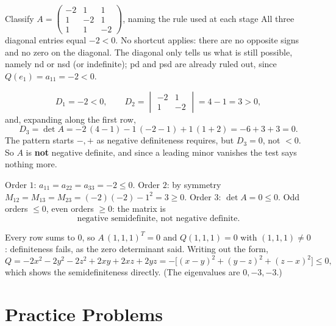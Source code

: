 \begin{worked}{Classify $A=\begin{pmatrix}-2&1&1\\1&-2&1\\1&1&-2\end{pmatrix}$, naming the rule used at each stage}
All three diagonal entries equal $-2<0$. No shortcut applies: there are no
opposite signs and no zero on the diagonal. The diagonal only tells us
what is still possible, namely nd or nsd (or indefinite); pd and psd are
already ruled out, since $Q(e_{1})=a_{11}=-2<0$.

\[
  D_{1}=-2<0,\qquad
  D_{2}=\begin{vmatrix}-2&1\\1&-2\end{vmatrix}=4-1=3>0,
\]
and, expanding along the first row,
\[
  D_{3}=\det A=-2\,(4-1)-1\,(-2-1)+1\,(1+2)=-6+3+3=0 .
\]
The pattern starts $-,+$ as negative definiteness requires, but
$D_{3}=0$, not $<0$. So $A$ is \textbf{not} negative definite, and since a
leading minor vanishes the test says nothing more.

Order $1$: $a_{11}=a_{22}=a_{33}=-2\le0$. Order $2$: by symmetry
$M_{12}=M_{13}=M_{23}=(-2)(-2)-1^{2}=3\ge0$. Order $3$: $\det A=0\le0$.
Odd orders $\le0$, even orders $\ge0$: the matrix is
\[
  \boxed{\text{negative semidefinite, not negative definite.}}
\]

Every row sums to $0$, so $A\,(1,1,1)^{T}=0$ and $Q(1,1,1)=0$ with
$(1,1,1)\neq0$: definiteness fails, as the zero determinant said. Writing
out the form,
\[
  Q=-2x^{2}-2y^{2}-2z^{2}+2xy+2xz+2yz
   =-\bigl[(x-y)^{2}+(y-z)^{2}+(z-x)^{2}\bigr]\le0 ,
\]
which shows the semidefiniteness directly. (The eigenvalues are $0,-3,-3$.)
\end{worked}

\section{Practice Problems}

